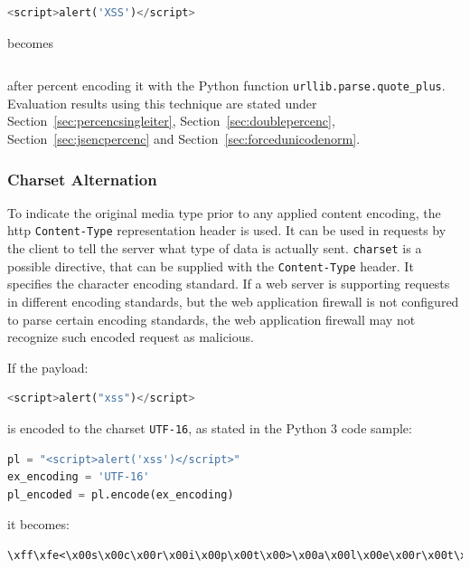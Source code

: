 \begin{lstlisting}[style=basicStyle, language=Python]
<script>alert('XSS')</script>
\end{lstlisting}

becomes

\begin{lstlisting}[style=basicStyle, language=Python]
%3Cscript%3Ealert%28%27XSS%27%29%3C%2Fscript%3E
\end{lstlisting}

after percent encoding it with the Python function \verb|urllib.parse.quote_plus|. Evaluation results using this technique are stated under Section~\ref{sec:percencsingleiter}, Section~\ref{sec:doublepercenc}, Section~\ref{sec:jsencpercenc} and Section~\ref{sec:forcedunicodenorm}.


\subsubsection{Charset Alternation}
\label{sec:charsetalt}
To indicate the original media type prior to any applied content encoding, the \acrshort{http} \verb|Content-Type| representation header is used.
It can be used in requests by the client to tell the server what type of data is actually sent.
\verb|charset| is a possible directive, that can be supplied with the \verb|Content-Type| header.
It specifies the character encoding standard. \cite{http/contenttype}
If a web server is supporting requests in different encoding standards, but the web application firewall is not configured to parse certain encoding standards, the web application firewall may not recognize such encoded request as malicious.

If the payload:

\begin{lstlisting}[style=basicStyle, language=Python]
<script>alert("xss")</script>
\end{lstlisting}

is encoded to the charset \verb|UTF-16|, as stated in the Python 3 code sample:

\begin{lstlisting}[style=basicStyle, language=Python]
pl = "<script>alert('xss')</script>"
ex_encoding = 'UTF-16'
pl_encoded = pl.encode(ex_encoding)
\end{lstlisting}

it becomes:

\begin{lstlisting}[style=basicStyle]
\xff\xfe<\x00s\x00c\x00r\x00i\x00p\x00t\x00>\x00a\x00l\x00e\x00r\x00t\x00(\x00'\x00x\x00s\x00s\x00'\x00)\x00<\x00/\x00s\x00c\x00r\x00i\x00p\x00t\x00>\x00
\end{lstlisting}

